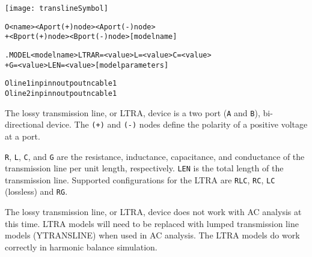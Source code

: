 


\begin{Device}

\symbol
{\texttt{[image: translineSymbol]}}

\device
\begin{alltt}
O<name> <A port (+) node> <A port (-) node>
+ <B port (+) node> <B port (-) node> [model name]
\end{alltt}

\model
\begin{alltt}
.MODEL <model name> LTRA R=<value> L=<value> C=<value>
+ G=<value> LEN=<value> [model parameters]
\end{alltt}

\examples
\begin{alltt}
Oline1 inp inn outp outn cable1
Oline2 inp inn outp outn cable1
\end{alltt}

\comments

The lossy transmission line, or LTRA, device is a two port (\texttt{A}
and \texttt{B}), bi-directional device. The \texttt{(+)} and \texttt{(-)} nodes
define the polarity of a positive voltage at a port.

\texttt{R}, \texttt{L}, \texttt{C}, and \texttt{G} are the resistance,
inductance, capacitance, and conductance of the transmission line per unit
length, respectively. \texttt{LEN} is the total length of the transmission
line. Supported configurations for the LTRA are \texttt{RLC}, \texttt{RC},
\texttt{LC} (lossless) and \texttt{RG}.

The lossy transmission line, or LTRA, device does not work with AC
analysis at this time.  LTRA models will need to be replaced with
lumped transmission line models (YTRANSLINE) when used in AC analysis.
The LTRA models do work correctly in harmonic balance simulation.
\end{Device}


%

